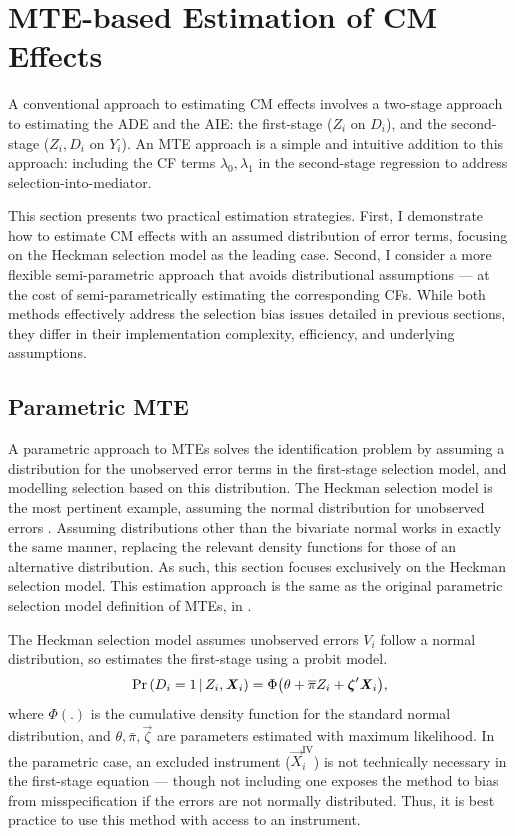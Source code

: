 \section{MTE-based Estimation of CM Effects}
\label{sec:controlfun}
A conventional approach to estimating CM effects involves a two-stage approach to estimating the ADE and the AIE: the first-stage ($Z_i$ on $D_i$), and the second-stage ($Z_i, D_i$ on $Y_i$).
An MTE approach is a simple and intuitive addition to this approach: including the CF terms $\lambda_0, \lambda_1$ in the second-stage regression to address selection-into-mediator.

This section presents two practical estimation strategies.
First, I demonstrate how to estimate CM effects with an assumed distribution of error terms, focusing on the Heckman selection model as the leading case.
Second, I consider a more flexible semi-parametric approach that avoids distributional assumptions --- at the cost of semi-parametrically estimating the corresponding CFs.
While both methods effectively address the selection bias issues detailed in previous sections, they differ in their implementation complexity, efficiency, and underlying assumptions.

\subsection{Parametric MTE}
A parametric approach to MTEs solves the identification problem by assuming a distribution for the unobserved error terms in the first-stage selection model, and modelling selection based on this distribution.
The Heckman selection model is the most pertinent example, assuming the normal distribution for unobserved errors \citep{heckman1979sample}.
Assuming distributions other than the bivariate normal works in exactly the same manner, replacing the relevant density functions for those of an alternative distribution.
As such, this section focuses exclusively on the Heckman selection model.
This estimation approach is the same as the original parametric selection model definition of MTEs, in \cite{bjorklund1987estimation}.

The Heckman selection model assumes unobserved errors $V_i$ follow a normal distribution, so estimates the first-stage using a probit model.
\[ \Pr\left( D_i = 1 \, \middle\vert \, Z_i, \boldsymbol{\mathit{X}}_i \right)
    = \Phi \big( \theta + \overline{\pi} Z_i + \boldsymbol{\mathit{\zeta}}' \boldsymbol{\mathit{X}}_i \big), \]
where $\Phi(.)$ is the cumulative density function for the standard normal distribution, and $\theta, \bar\pi, \vec\zeta$ are parameters estimated with maximum likelihood.
In the parametric case, an excluded instrument ($\vec X_i^{\text{IV}}$) is not technically necessary in the first-stage equation --- though not including one exposes the method to bias from misspecification if the errors are not normally distributed.
Thus, it is best practice to use this method with access to an instrument.

